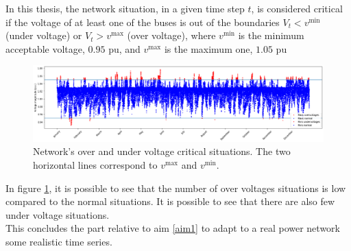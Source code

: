 In this thesis, the network situation, in a given time step $t$, is considered critical if the voltage of at least one of the buses is out of the boundaries $V_t < v^{\text{min}}$ (under voltage) or $V_t > v^{\text{max}}$ (over voltage), where $v^{\text{min}}$ is the minimum acceptable voltage, $0.95$ \gls{pu}, and $v^{\text{max}}$ is the maximum one, $1.05$ \gls{pu}\\
\begin{figure}[H]
\centering
    \includegraphics[width=1\linewidth]{images/MVOberr/CritialSituations.png}
\caption[Network's critical situations]{Network's over and under voltage critical situations. The two horizontal lines correspond to $v^{\text{max}}$ and $v^{\text{min}}$.}
\label{fig:ctb}
\end{figure}

In figure \ref{fig:ctb}, it is possible to see that the number of over voltages situations is low compared to the normal situations. It is possible to see that there are also few under voltage situations.\\

This concludes the part relative to aim \ref{aim1} to adapt to a real power network some realistic time series.